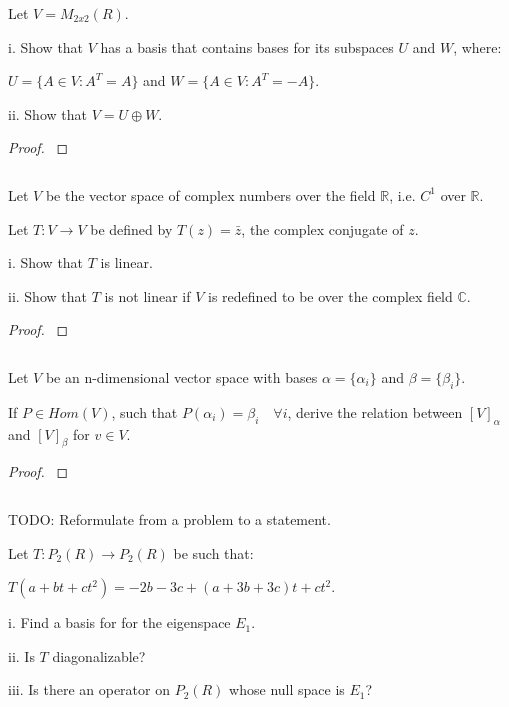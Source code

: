 \documentclass{article}
\newenvironment{customthm}[1]
  {\renewcommand\theinnercustomthm{#1}\innercustomthm}
  {\endinnercustomthm}
\begin{document}
\begin{customthm}{13}[2022.S(1.B)]
  $ $

  Let $V=M_{2x2}(R)$.
  
  i. Show that $V$ has a basis that contains bases for its subspaces $U$ and $W$, where:
  
  \qquad $U = \{ A \in V: A^T = A \}$ and $W = \{ A \in V: A^T = -A \}$.

  ii. Show that $V = U \oplus W$.
\end{customthm}

\begin{proof}
  $ $

  


\end{proof}
\newpage


\begin{customthm}{14}[2022.S(1.D)]
  $ $

  Let $V$ be the vector space of complex numbers over the field $\mathbb{R}$, i.e. $C^1$ over $\mathbb{R}$.

  Let $T: V \rightarrow V$ be defined by $T(z) = \bar{z}$, the complex conjugate of $z$.

  i. Show that $T$ is linear.

  ii. Show that $T$ is not linear if $V$ is redefined to be over the complex field $\mathbb{C}$.
\end{customthm}

\begin{proof}
  $ $

  


\end{proof}
\newpage



\begin{customthm}{15}[2022.S(2.A)]
  $ $

  Let $V$ be an n-dimensional vector space with bases $\alpha = \{\alpha_i\}$ and $\beta = \{\beta_i\}$.
  
  If $P \in Hom(V)$, such that $P(\alpha_i) = \beta_i \quad \forall i$, derive the relation between $[V]_\alpha$ and $[V]_\beta$ for $v \in V$.
\end{customthm}

\begin{proof}
  $ $

  


\end{proof}
\newpage


\begin{customthm}{16}[2022.S(2.B)]
  $ $

  TODO: Reformulate from a problem to a statement.
  \newline

  Let $T: P_2(R) \rightarrow P_2(R)$ be such that: 

  \qquad $T(a + bt + ct^2) = -2b -3c + (a+3b+3c)t + ct^2$.

  i. Find a basis for for the eigenspace $E_1$.

  ii. Is $T$ diagonalizable?

  iii. Is there an operator on $P_2(R)$ whose null space is $E_1$?
\end{customthm}
\end{document}

